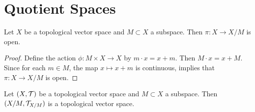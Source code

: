 \documentclass{book}
\begin{document}
	























	\newpage
	\section{Quotient Spaces}
	
	\begin{ex}
		Let $X$ be a topological vector space and $M \subset X$ a subspace. Then $\pi: X \rightarrow X / M$ is open. 
	\end{ex}

	\begin{proof}
		Define the action $\phi: M \times X \rightarrow X$ by $m \cdot x = x + m$. Then $M \cdot x = x+ M$. Since for each $m \in M$, the map $x \mapsto x +m$ is continuous,  implies that $\pi: X \rightarrow X/M$ is open.  
	\end{proof}
	
	\begin{ex}
		Let $(X, \mathcal{T})$ be a topological vector space and $M \subset X$ a subspace. Then $(X/M, \mathcal{T}_{X/M})$ is a topological vector space.
	\end{ex}
\end{document}
